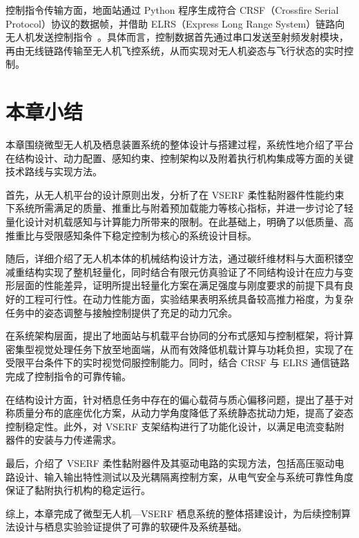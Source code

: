 控制指令传输方面，地面站通过 Python 程序生成符合 CRSF（Crossfire Serial Protocol）协议的数据帧，并借助 ELRS（Express Long Range System）链路向无人机发送控制指令~\cite{peng2006elrs}。具体而言，控制数据首先通过串口发送至射频发射模块，再由无线链路传输至无人机飞控系统，从而实现对无人机姿态与飞行状态的实时控制。

\section{本章小结}

本章围绕微型无人机及栖息装置系统的整体设计与搭建过程，系统性地介绍了平台在结构设计、动力配置、感知约束、控制架构以及附着执行机构集成等方面的关键技术路线与实现方法。

首先，从无人机平台的设计原则出发，分析了在 VSERF 柔性黏附器件性能约束下系统所需满足的质量、推重比与附着预加载能力等核心指标，并进一步讨论了轻量化设计对机载感知与计算能力所带来的限制。在此基础上，明确了以低质量、高推重比与受限感知条件下稳定控制为核心的系统设计目标。

随后，详细介绍了无人机本体的机械结构设计方法，通过碳纤维材料与大面积镂空减重结构实现了整机轻量化，同时结合有限元仿真验证了不同结构设计在应力与变形层面的性能差异，证明所提出轻量化方案在满足强度与刚度要求的前提下具有良好的工程可行性。在动力性能方面，实验结果表明系统具备较高推力裕度，为复杂任务中的姿态调整与接触控制提供了充足的动力冗余。

在系统架构层面，提出了地面站与机载平台协同的分布式感知与控制框架，将计算密集型视觉处理任务下放至地面端，从而有效降低机载计算与功耗负担，实现了在受限平台条件下的实时视觉伺服控制能力。同时，结合 CRSF 与 ELRS 通信链路完成了控制指令的可靠传输。

在结构设计方面，针对栖息任务中存在的偏心载荷与质心偏移问题，提出了基于对称质量分布的底座优化方案，从动力学角度降低了系统静态扰动力矩，提高了姿态控制稳定性。此外，对 VSERF 支架结构进行了功能化设计，以满足电流变黏附器件的安装与力传递需求。

最后，介绍了 VSERF 柔性黏附器件及其驱动电路的实现方法，包括高压驱动电路设计、输入输出特性测试以及光耦隔离控制方案，从电气安全与系统可靠性角度保证了黏附执行机构的稳定运行。

综上，本章完成了微型无人机—VSERF 栖息系统的整体搭建设计，为后续控制算法设计与栖息实验验证提供了可靠的软硬件及系统基础。